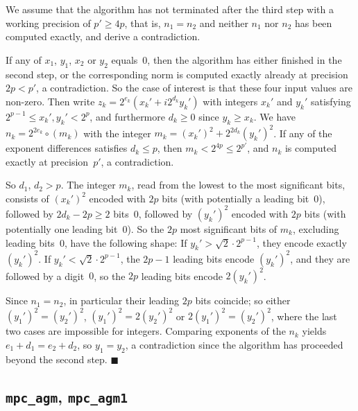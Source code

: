 \documentclass [11pt]{article}
\newcommand {\round}{\operatorname {\circ}}
\renewcommand {\leq}{\leqslant}
\renewcommand {\geq}{\geqslant}
\newenvironment{proof}{\noindent{\bf Proof:}}{{\hspace* {\fill}$\blacksquare$}}
\begin{document}
\begin {proof}
We assume that the algorithm has not terminated after the third step with a
working precision of $p' \geq 4p$, that is, $n_1 = n_2$ and neither
$n_1$ nor $n_2$ has been computed exactly, and derive a contradiction.

If any of $x_1$, $y_1$, $x_2$ or $y_2$ equals~$0$, then the algorithm has
either finished in the second step, or the corresponding norm is computed
exactly already at precision $2p < p'$, a contradiction.
So the case of interest is that these four input values are non-zero.
Then write $z_k = 2^{e_k} (x_k' + i 2^{d_k} y_k')$ with integers
$x_k'$ and $y_k'$ satisfying $2^{p-1} \leq x_k', y_k' < 2^p$, and
furthermore $d_k \geq 0$ since $y_k \geq x_k$.
We have
$n_k = 2^{2 e_k} \round (m_k)$ with the integer
$m_k = (x_k')^2 + 2^{2 d_k} (y_k')^2$.
If any of the exponent differences satisfies $d_k \leq p$, then
$m_k < 2^{4 p} \leq 2^{p'}$, and $n_k$ is computed exactly at precision~$p'$,
a contradiction.

So $d_1$, $d_2 > p$. The integer $m_k$, read from the lowest to the most
significant bits, consists of $(x_k')^2$ encoded with $2 p$ bits (with
potentially a leading bit~$0$), followed by $2 d_k - 2 p \geq 2$ bits~$0$,
followed by $(y_k')^2$ encoded with $2 p$ bits (with potentially one leading
bit~$0$).
So the $2 p$ most significant bits of $m_k$, excluding leading
bits~$0$, have the following shape:
If $y_k' > \sqrt 2 \cdot 2^{p-1}$, they encode exactly $(y_k')^2$.
If $y_k' < \sqrt 2 \cdot 2^{p-1}$, the $2 p - 1$ leading bits encode
$(y_k')^2$, and they are followed by a digit~$0$, so the $2 p$ leading
bits encode $2 (y_k')^2$. 

Since $n_1 = n_2$, in particular their leading $2 p$ bits coincide;
so either $(y_1')^2 = (y_2')^2$, $(y_1')^2 = 2 (y_2')^2$ or
$2 (y_1')^2 = (y_2')^2$, where the last two cases are impossible
for integers.
Comparing exponents of the $n_k$ yields
$e_1 + d_1 = e_2 + d_2$, so $y_1 = y_2$,
a contradiction since the algorithm has proceeded beyond the second step.
\end {proof}


\subsection{\texttt {mpc\_agm}, \texttt {mpc\_agm1}}
\end{document}
